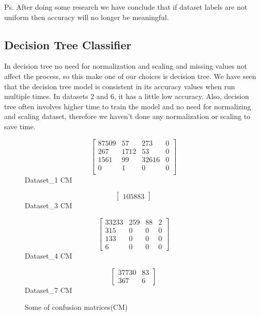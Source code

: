 \documentclass[submission,copyright,creativecommons]{eptcs}
\begin{document}
Ps. After doing some research we have conclude that if dataset labels are not uniform then accuracy will no longer be meaningful.

\subsection{Decision Tree Classifier}
In decision tree no need for normalization and scaling and missing values not affect the process, so this make one of our choices is decision tree. We have seen that the decision tree model is consistent in its accuracy values when run multiple times. In datasets 2 and 6, it has a little low accuracy. Also, decision tree often involves higher time to train the model and no need for normalizing and scaling dataset, therefore we haven't done any normalization or scaling to save time.
\\
\begin{figure}[h!]
\begin{minipage}{.3\linewidth}
    \centering
    \[\left[\begin{array}{cccc}
      87509 & 57 & 273 & 0\\
      267 & 1712 & 53 & 0\\
      1561 & 99 & 32616 & 0\\
      0 & 1 & 0 & 0\\
    \end{array}\right]\]
    Dataset\_1 CM
  \end{minipage} 
  \begin{minipage}{.15\linewidth}
    \centering
    \[\left[\begin{array}{cc}
      105883
    \end{array}\right]\]
    Dataset\_3 CM
  \end{minipage}%
  \begin{minipage}{.25\linewidth}
    \centering
    \[\left[\begin{array}{cccc}
      33233 & 259 & 88 & 2 \\
      315 & 0 & 0 & 0 \\
      133 & 0 & 0 & 0 \\
      6 & 0 & 0 & 0
    \end{array}\right]\]
    Dataset\_4 CM
  \end{minipage} 
  \begin{minipage}{.2\linewidth}
    \centering
    \[\left[\begin{array}{cc}
      37730 & 83 \\
      367 & 6
    \end{array}\right]\]
    Dataset\_7 CM
  \end{minipage}

  
  \caption{Some of confusion matrices(CM)}
\end{figure}\\
\end{document}
